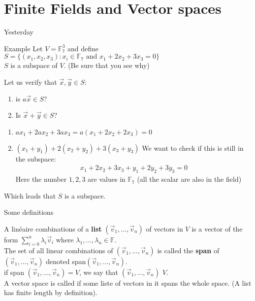 \section{Finite Fields and Vector spaces}


\begin{parag}{Yesterday}
    
    \begin{subparag}{Example}
        Let $V =  \mathbb{F}_7^3$ and define $S =  \{\left(x_1, x_2, x_3\right): x_i \in \mathbb{F}_7 \text{ and } x_1 + 2x_2 + 3x_3 = 0\}$\\
        $S$ is a subspace of $V$. (Be sure that you see why)
    \end{subparag}
    Let us verify that $\vec{x}, \vec{y} \in S$:\\
    \begin{enumerate}
        \item is $a\vec{x} \in S$?
        \item Is $\vec{x} + \vec{y} \in S$?
    \end{enumerate}
    \begin{enumerate}
        \item $ax_1 + 2ax_2 + 3ax_3 = a\left(x_1 + 2x_2 + 2x_3\right) =  0$
        \item $\left(x_1 + y_1\right) + 2\left(x_2 + y_2\right) + 3\left(x_3 + y_3\right)$ We want to check if this is still in the subspace:
            \begin{align*} 
                x_1 + 2x_2 + 3x_3 + y_1 + 2y_2 + 3y_3 = 0
            \end{align*}
            Here the number $1, 2, 3$ are values in $\mathbb{F}_7$ (all the scalar are also in the field)
    \end{enumerate}
    Which leads that $S$ is a subspace.
\end{parag}
\begin{parag}{Some definitions }
    \begin{definition}
    A linéaire combinations of a \textbf{list} $\left(\vec{v}_1, \ldots, \vec{v}_n\right)$ of vectors in $V$ is a vector of the form $\sum_{i = 0}^{n} \lambda_i \vec{v}_i$ where $\lambda_1, \ldots, \lambda_n \in \mathbb{F}$.\\
    The set of all linear combinations of $\left(\vec{v}_1, \ldots, \vec{v}_n\right)$ is called the \textbf{span} of $\left(\vec{v}_1, \ldots, \vec{v}_n\right)$ denoted span$\left(\vec{v}_1, \ldots, \vec{v}_n\right)$.\\
if span $\left(\vec{v}_1, \ldots, \vec{v}_n\right) =  V$, we say that $\left(\vec{v}_1, \ldots, \vec{v}_n\right)$  $V$.\\
A vector space is called  if some liste of vectors in it spans the whole space. (A list has finite length by definition).
    \end{definition}
\end{parag}

